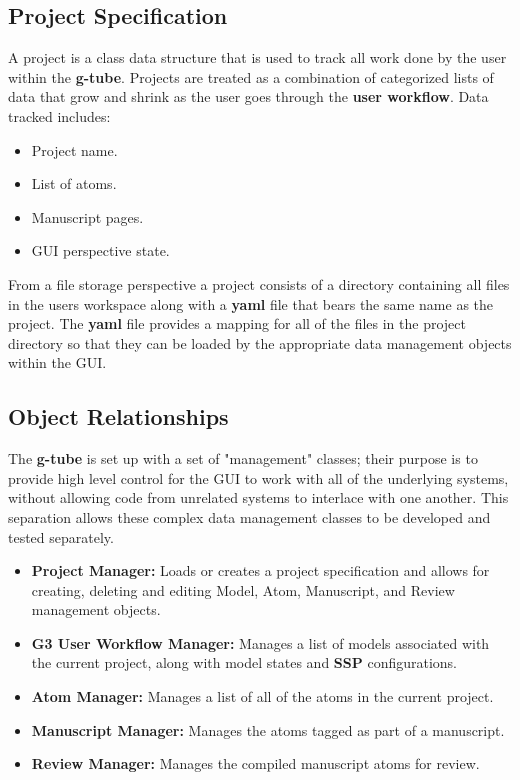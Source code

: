 \documentclass[12pt]{article}
\begin{document}
\subsection*{Project Specification}

	A project is a class data structure that is used to track all work done by the user within the {\bf g-tube}. Projects are treated as a combination of categorized lists of data that grow and shrink as the user goes through the {\bf user workflow}. Data tracked includes:
	
\begin{itemize}
	\item[] Project name.
	\item[] List of atoms.
	\item[] Manuscript pages.
	\item[] GUI perspective state.
\end{itemize}

From a file storage perspective a project consists of a directory containing all files in the users workspace along with a {\bf yaml} file that bears the same name as the project. The {\bf yaml} file provides a mapping for all of the files in the project directory so that they can be loaded by the appropriate data management objects within the GUI.

\subsection*{Object Relationships}

	The {\bf g-tube} is set up with a set of "management" classes; their purpose is to provide high level control for the GUI to work with all of the underlying systems, without allowing code from unrelated systems to interlace with one another. This separation allows these complex data management classes to be developed and tested separately.

\begin{itemize}
	\item[] {\bf Project Manager:} Loads or creates a project specification and allows for creating, deleting and editing Model, Atom, Manuscript, and Review management objects.
	\item[] {\bf G3 User Workflow Manager:} Manages a list of models associated with the current project, along with model states and {\bf SSP} configurations.
	\item[] {\bf Atom Manager:} Manages a list of all of the atoms in the current project. 
	\item[] {\bf Manuscript Manager:} Manages the atoms tagged as part of a manuscript.
	\item[] {\bf Review Manager:} Manages the compiled manuscript atoms for review.
\end{itemize}
\end{document}

